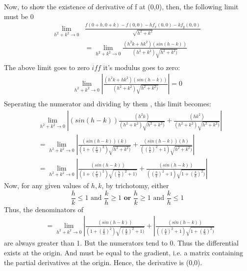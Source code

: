 \documentclass[20pt,a4paper]{extarticle} %
\theoremstyle{definition}
\theoremstyle{definition}
\begin{document}
Now, to show the existence of derivative of f at (0,0), then, the following limit must be 0
\begin{equation*}
	\begin{split}
		\lim_{h^2+k^2 \to 0}&\frac{f(0+h,0+k)-f(0,0) -hf_x(0,0)-kf_y(0,0)
		}{\sqrt{h^2+k^2}} \\
		&=\lim_{h^2+k^2 \to 0} \frac{(h^2k+hk^2)(sin(h-k))}{(h^2+k^2)\sqrt{h^2+k^2)}} \\
\end{split}
\end{equation*}
The above limit goes to zero $iff$ it's modulus goes to zero:
\begin{equation*}
	\begin{split}
		\lim_{h^2+k^2 \to 0}| \frac{(h^2k+hk^2)(sin(h-k))}{(h^2+k^2)\sqrt{h^2+k^2)}} |=0\\
	\end{split}
\end{equation*}
Seperating the numerator and dividing by them , this limit becomes:
\begin{equation*}
	\begin{split}
		&\lim_{h^2+k^2 \to 0}| (sin(h-k))\frac{(h^2k)}{(h^2+k^2)\sqrt{h^2+k^2)}}
		+\frac{(hk^2)}{(h^2+k^2)\sqrt{h^2+k^2)}} |\\
		&=\lim_{h^2+k^2 \to 0}
		|\frac{(sin(h-k))(k)}{(1+( \frac{k}{h} )^2)\sqrt{h^2+k^2)}}+
		\frac{(sin(h-k))(h)}{(( \frac{h}{k} )^2+1)\sqrt{h^2+k^2)}}|\\
		&=\lim_{h^2+k^2 \to 0} |\frac{(sin(h-k))}{(1+( \frac{k}{h} )^2)\sqrt{ (\frac{h}{k} )^2+1)}}+
		\frac{(sin(h-k))}{(( \frac{h}{k})^2+1)\sqrt{ 1+(\frac{k}{h} )^2)}}|
	\end{split}
\end{equation*}
Now, for any given values of $h,k$, by trichotomy, either
\[ \frac{h}{k} \leq 1 \text{ and } \frac{k}{h} \geq 1  \textbf{ or } \frac{h}{k} \geq 1 \text{ and } \frac{k}{h} \leq 1\]
Thus, the denominators of
\begin{equation*}
	\begin{split}
					&=\lim_{h^2+k^2 \to 0} |\frac{(sin(h-k))}{(1+( \frac{k}{h} )^2)\sqrt{ (\frac{h}{k} )^2+1)}}+
					|\frac{(sin(h-k))}{(( \frac{h}{k})^2+1)\sqrt{ 1+(\frac{k}{h} )^2)}}
	\end{split}
\end{equation*}
are always greater than 1. But the numerators tend to 0.
Thus the differential exists at the origin. And must be equal to the gradient, i.e. a matrix
containing the partial derivatives at the origin. Hence, the derivative is (0,0).
\end{document}
